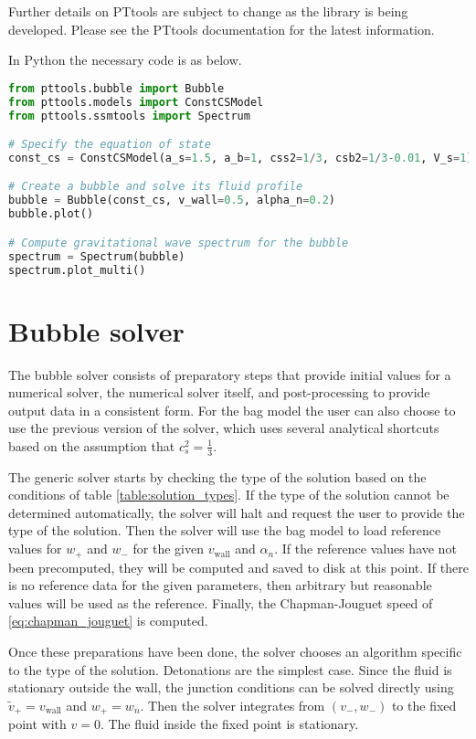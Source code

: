 Further details on PTtools are subject to change as the library is being developed.
Please see the PTtools documentation for the latest information.

In Python the necessary code is as below.
\begin{lstlisting}[language=Python]
from pttools.bubble import Bubble
from pttools.models import ConstCSModel
from pttools.ssmtools import Spectrum

# Specify the equation of state
const_cs = ConstCSModel(a_s=1.5, a_b=1, css2=1/3, csb2=1/3-0.01, V_s=1)

# Create a bubble and solve its fluid profile
bubble = Bubble(const_cs, v_wall=0.5, alpha_n=0.2)
bubble.plot()

# Compute gravitational wave spectrum for the bubble
spectrum = Spectrum(bubble)
spectrum.plot_multi()    
\end{lstlisting}


\section{Bubble solver}
The bubble solver consists of preparatory steps that provide initial values for a numerical solver, the numerical solver itself, and post-processing to provide output data in a consistent form.
For the bag model the user can also choose to use the previous version of the solver,
which uses several analytical shortcuts based on the assumption that $c_s^2 = \frac{1}{3}$.

The generic solver starts by checking the type of the solution based on the conditions of table \ref{table:solution_types}.
If the type of the solution cannot be determined automatically, the solver will halt and request the user to provide the type of the solution.
Then the solver will use the bag model to load reference values for $w_+$ and $w_-$ for the given $v_\text{wall}$ and $\alpha_n$.
If the reference values have not been precomputed, they will be computed and saved to disk at this point.
If there is no reference data for the given parameters, then arbitrary but reasonable values will be used as the reference.
Finally, the Chapman-Jouguet speed of \eqref{eq:chapman_jouguet} is computed.

Once these preparations have been done,
the solver chooses an algorithm specific to the type of the solution.
Detonations are the simplest case.
Since the fluid is stationary outside the wall,
the junction conditions can be solved directly using
$\tilde{v}_+ = v_\text{wall}$ and $w_+ = w_n$.
Then the solver integrates from $(v_-, w_-)$ to the fixed point with $v=0$.
The fluid inside the fixed point is stationary.

